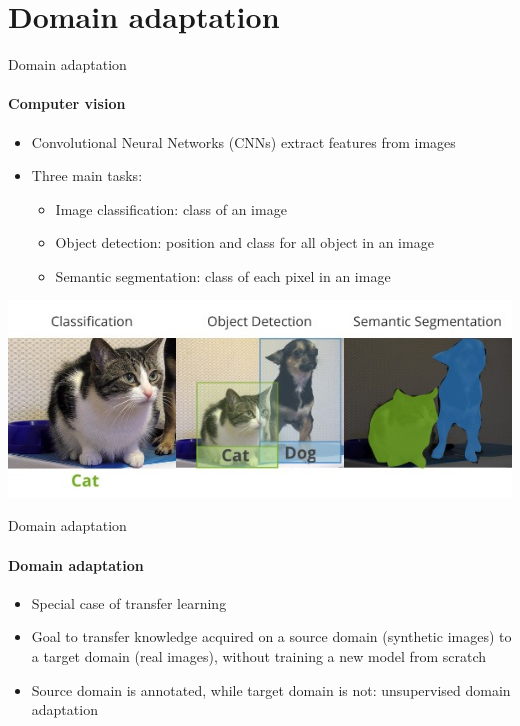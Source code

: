 \documentclass[aspectratio=141]{beamer}
\begin{document}
\section{Domain adaptation}
\begin{frame}{Domain adaptation}
    \framesubtitle{Computer vision}
	\begin{itemize}
	\item \alert{Convolutional Neural Networks} (CNNs) extract features from images
	\item Three main tasks:
		\begin{itemize}
			\item \alert{Image classification}: class of an image
			\item \alert{Object detection}: position and class for all object in an image
			\item \alert{Semantic segmentation}: class of each pixel in an image
		\end{itemize}
	\end{itemize}
	
	\begin{center}
		\includegraphics[width=.7\textwidth]{imgs/classdetseg.jpeg}
	\end{center}
\end{frame}

\begin{frame}{Domain adaptation}
    \framesubtitle{Domain adaptation}
    
	\begin{itemize}
	    \item Special case of \alert{transfer learning}
	    \vspace*{4mm}
	    \item Goal to transfer knowledge acquired on a \alert{source} domain (synthetic images) to a \alert{target} domain (real images), without training a new model from scratch
	    \vspace*{4mm}
		\item Source domain is annotated, while target domain is not: \alert{unsupervised} domain adaptation
	\end{itemize}
\end{frame}
\end{document}
